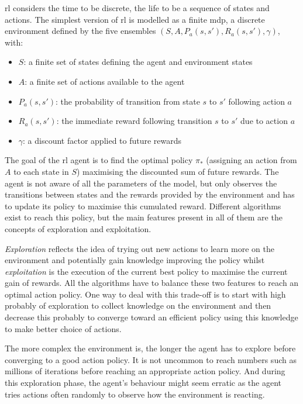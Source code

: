 	\gls{rl} considers the time to be discrete, the life to be a sequence of states and actions. The simplest version of \gls{rl} is modelled as a finite \gls{mdp}, a discrete environment defined by the five ensembles $(S, A, P_a(s,s'), R_a(s,s'), \gamma)$, with:
	\begin{itemize}
		\item $S$: a finite set of states defining the agent and environment states
		\item $A$: a finite set of actions available to the agent
		\item $P_a(s,s')$: the probability of transition from state $s$ to $s'$ following action $a$
		\item $R_a(s,s')$: the immediate reward following transition $s$ to $s'$ due to action $a$
		\item $\gamma$: a discount factor applied to future rewards
	\end{itemize}
	
	The goal of the \gls{rl} agent is to find the optimal policy $\pi_*$ (assigning an action from $A$ to each state in $S$) maximising the discounted sum of future rewards. The agent is not aware of all the parameters of the model, but only observes the transitions between states and the rewards provided by the environment and has to update its policy to maximise this cumulated reward. Different algorithms exist to reach this policy, but the main features present in all of them are the concepts of exploration and exploitation.
	
	\textit{Exploration} reflects the idea of trying out new actions to learn more on the environment and potentially gain knowledge improving the policy whilst \textit{exploitation} is the execution of the current best policy to maximise the current gain of rewards. All the algorithms have to balance these two features to reach an optimal action policy. One way to deal with this trade-off is to start with high probably of exploration to collect knowledge on the environment and then decrease this probably to converge toward an efficient policy using this knowledge to make better choice of actions.
	
	The more complex the environment is, the longer the agent has to explore before converging to a good action policy. It is not uncommon to reach numbers such as millions of iterations before reaching an appropriate action policy. And during this exploration phase, the agent's behaviour might seem erratic as the agent tries actions often randomly to observe how the environment is reacting.
	
